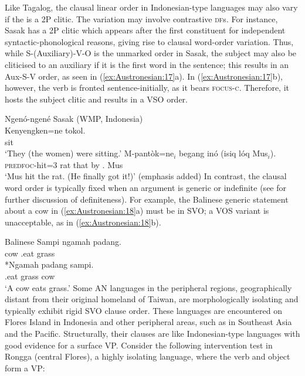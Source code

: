 \documentclass[output=paper,chinesefont]{../langscibook}
\begin{document}
Like Tagalog, the clausal linear order in Indonesian-type languages may also vary if the \SUBJ is a 2P clitic. The variation may involve contrastive \textsc{df}s. For instance, Sasak has a 2P clitic \SUBJ\citep{Austin2004} which appears after the first constituent for independent syntactic-phonological reasons, giving rise to clausal word-order variation. Thus, while S-(Auxiliary)-V-O is the unmarked order in Sasak, the subject may also be cliticised to an auxiliary if it is the first word in the sentence; this results in an Aux-S-V order, as seen in (\ref{ex:Austronesian:17}a). In (\ref{ex:Austronesian:17}b), however, the verb is fronted sentence-initially, as it bears \textsc{focus-c}. Therefore, it hosts the subject clitic and results in a VSO order.

\ea\label{ex:Austronesian:17} Ngenó-ngené Sasak (WMP, Indonesia) \citep[29,~32]{Asikin-Garmager2017}\\
\ea\gll
Kenyengken=ne tokol.\\
 sit\\
\glt`They (the women) were sitting.'
\ex\gll
M-pantòk=ne$_i$ begang inó (isiq lóq Mus$_i$). \\
\textsc{predfoc}-hit=3 rat that \phantom{(}by {\ART.\M} Mus \\
\glt `Mus hit the rat. (He finally got it!)' (emphasis added)
\z\z
In contrast, the clausal word order is typically fixed when an argument is generic or indefinite (see  for further discussion of definiteness). For example, the Balinese generic statement about a cow in (\ref{ex:Austronesian:18}a) must be in SVO; a VOS variant is unacceptable, as in (\ref{ex:Austronesian:18}b).

\ea\label{ex:Austronesian:18} Balinese \citep[261]{Arka2019}
\ea\gll
Sampi ngamah padang. \\
cow \AV.eat grass\\
\ex\gll
*Ngamah padang sampi.\\
\phantom{*}\AV.eat grass cow\\
\glt`A cow eats grass.'
\z\z
Some AN languages in the peripheral regions, geographically distant from their original homeland of Taiwan, are morphologically isolating and typically exhibit rigid SVO clause order. These languages are encountered on Flores Island in Indonesia and other peripheral areas, such as in Southeast Asia and the Pacific. Structurally, their clauses are like Indonesian-type languages with good evidence for a surface VP. Consider the following intervention test in Rongga (central Flores), a highly isolating language, where the verb and object form a VP:
\end{document}
